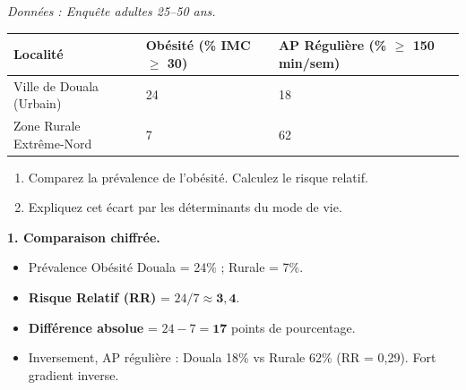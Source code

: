 \documentclass[11pt]{article}
\begin{document}
\begin{exoresolu}
\textit{Données : Enquête adultes 25--50 ans.}
\begin{center}
\begin{tabularx}{\linewidth}{|l|X|X|}\hline
\rowcolor{popblueL} \textbf{Localité} & \textbf{Obésité (\% IMC $\geq$ 30)} & \textbf{AP Régulière (\% $\geq$ 150 min/sem)} \\ \hline
Ville de Douala (Urbain) & 24 & 18 \\ \hline
Zone Rurale Extrême-Nord & 7 & 62 \\ \hline
\end{tabularx}
\end{center}
\begin{enumerate}
\item Comparez la prévalence de l'obésité. Calculez le risque relatif.
\item Expliquez cet écart par les déterminants du mode de vie.
\end{enumerate}
\tcblower
\textbf{1. Comparaison chiffrée.}
\begin{itemize}
\item Prévalence Obésité Douala = 24\% ; Rurale = 7\%.
\item \textbf{Risque Relatif (RR)} = $24 / 7 \approx \mathbf{3,4}$.
\item \textbf{Différence absolue} = $24 - 7 = \mathbf{17}$ points de pourcentage.
\item Inversement, AP régulière : Douala 18\% vs Rurale 62\% (RR = 0,29). Fort gradient inverse.
\end{itemize}


\end{exoresolu}
\end{document}
